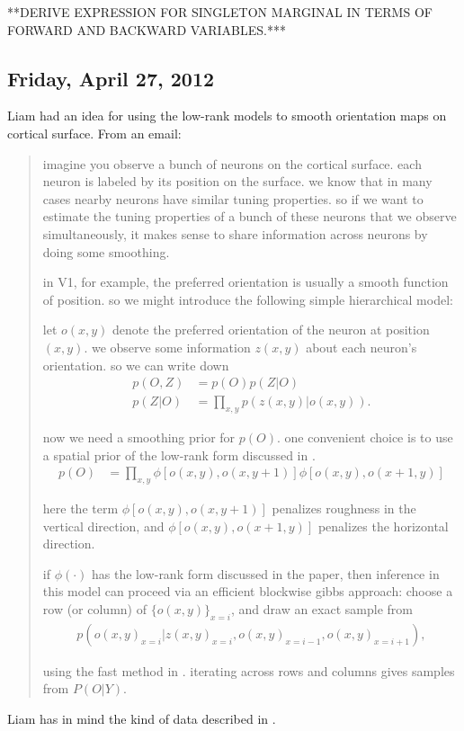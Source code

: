 \documentclass[11pt]{article}
\newcommand{\paperlink}[1]{\href{Documents/papers/#1.pdf}{\cite{#1}}}
\begin{document}
\noindent ***DERIVE EXPRESSION FOR SINGLETON MARGINAL IN TERMS OF FORWARD AND BACKWARD VARIABLES.***

\subsection*{Friday, April 27, 2012}
Liam had an idea for using the low-rank models to smooth orientation maps on cortical surface. From an email:

\begin{quotation}
\noindent imagine you observe a bunch of neurons on the cortical surface.  each neuron is labeled by its position on the surface.  we know that in many cases nearby neurons have similar tuning properties.  so if we want to estimate the tuning properties of a bunch of these neurons that we observe simultaneously, it makes sense to share information across neurons by doing some smoothing.  

in V1, for example, the preferred orientation is usually a smooth function of position.  so we might introduce the following simple hierarchical model:

let $o(x,y)$ denote the preferred orientation of the neuron at position $(x,y)$.  we observe some information $z(x,y)$ about each neuron's orientation.  so we can write down
%
\begin{align*}
p(O,Z) &= p(O) p(Z|O) \\
p(Z|O) &= \prod_{x,y} p( z(x,y) | o(x,y) ).
\end{align*}

\noindent now we need a smoothing prior for $p(O)$.  one convenient choice is to use a spatial prior of the low-rank form discussed in \paperlink{Smith_2012}.
%
\begin{align*}
p(O) &= \prod_{x,y} \phi[o(x,y),o(x,y+1)] \phi[o(x,y),o(x+1,y)]
\end{align*}

\noindent here the term $\phi[o(x,y),o(x,y+1)]$ penalizes roughness in the vertical direction, and $\phi[o(x,y),o(x+1,y)]$ penalizes the horizontal direction.

if $\phi(\cdot)$ has the low-rank form discussed in the paper, then inference in this model can proceed via an efficient blockwise gibbs approach: choose a row (or column) of $\{o(x,y)\}_{x=i}$, and draw an exact sample from 
%
\begin{align*}
p( {o(x,y)}_{x=i} | {z(x,y)}_{x=i}, {o(x,y)}_{x=i-1}, {o(x,y)}_{x=i+1} ),
\end{align*}

\noindent using the fast method in \paperlink{Smith_2012}.  iterating across rows and columns gives samples from $P(O|Y)$.
\end{quotation}

Liam has in mind the kind of data described in \paperlink{Ohki_2006}.



\end{document}
